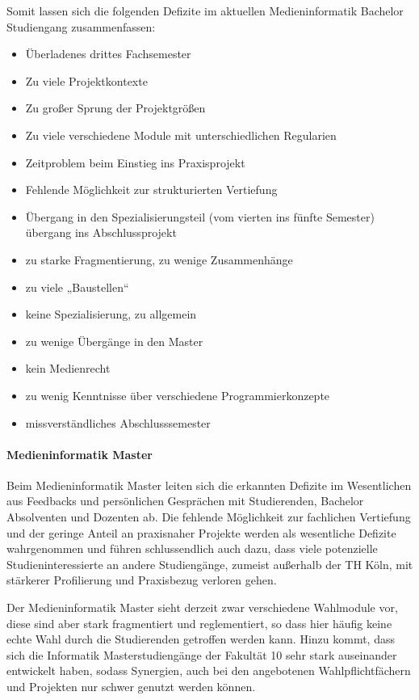 Somit lassen sich die folgenden Defizite im aktuellen Medieninformatik
Bachelor Studiengang zusammenfassen:

\begin{itemize}
\tightlist
\item
  Überladenes drittes Fachsemester
\item
  Zu viele Projektkontexte
\item
  Zu großer Sprung der Projektgrößen
\item
  Zu viele verschiedene Module mit unterschiedlichen Regularien
\item
  Zeitproblem beim Einstieg ins Praxisprojekt
\item
  Fehlende Möglichkeit zur strukturierten Vertiefung
\item
  Übergang in den Spezialisierungsteil (vom vierten ins fünfte Semester)
  übergang ins Abschlussprojekt
\item
  zu starke Fragmentierung, zu wenige Zusammenhänge
\item
  zu viele „Baustellen``
\item
  keine Spezialisierung, zu allgemein
\item
  zu wenige Übergänge in den Master
\item
  kein Medienrecht
\item
  zu wenig Kenntnisse über verschiedene Programmierkonzepte
\item
  missverständliches Abschlusssemester
\end{itemize}

\paragraph{Medieninformatik Master}\label{medieninformatik-master}

Beim Medieninformatik Master leiten sich die erkannten Defizite im
Wesentlichen aus Feedbacks und persönlichen Gesprächen mit Studierenden,
Bachelor Absolventen und Dozenten ab. Die fehlende Möglichkeit zur
fachlichen Vertiefung und der geringe Anteil an praxisnaher Projekte
werden als wesentliche Defizite wahrgenommen und führen schlussendlich
auch dazu, dass viele potenzielle Studieninteressierte an andere
Studiengänge, zumeist außerhalb der TH Köln, mit stärkerer Profilierung
und Praxisbezug verloren gehen.

Der Medieninformatik Master sieht derzeit zwar verschiedene Wahlmodule
vor, diese sind aber stark fragmentiert und reglementiert, so dass hier
häufig keine echte Wahl durch die Studierenden getroffen werden kann.
Hinzu kommt, dass sich die Informatik Masterstudiengänge der Fakultät 10
sehr stark auseinander entwickelt haben, sodass Synergien, auch bei den
angebotenen Wahlpflichtfächern und Projekten nur schwer genutzt werden
können.

